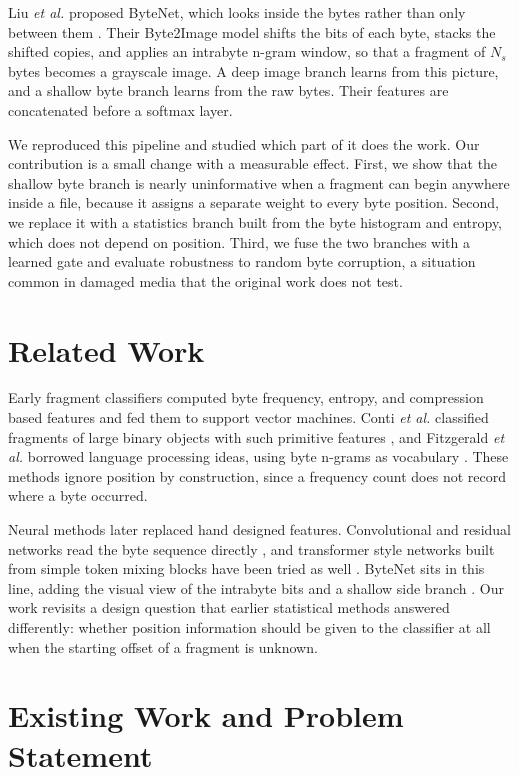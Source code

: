 \documentclass[journal]{IEEEtran}
\begin{document}
Liu \textit{et al.} proposed ByteNet, which looks inside the bytes rather than only between them \cite{bytenet}. Their Byte2Image model shifts the bits of each byte, stacks the shifted copies, and applies an intrabyte n-gram window, so that a fragment of $N_s$ bytes becomes a grayscale image. A deep image branch learns from this picture, and a shallow byte branch learns from the raw bytes. Their features are concatenated before a softmax layer.

We reproduced this pipeline and studied which part of it does the work. Our contribution is a small change with a measurable effect. First, we show that the shallow byte branch is nearly uninformative when a fragment can begin anywhere inside a file, because it assigns a separate weight to every byte position. Second, we replace it with a statistics branch built from the byte histogram and entropy, which does not depend on position. Third, we fuse the two branches with a learned gate and evaluate robustness to random byte corruption, a situation common in damaged media that the original work does not test.

\section{Related Work}
Early fragment classifiers computed byte frequency, entropy, and compression based features and fed them to support vector machines. Conti \textit{et al.} classified fragments of large binary objects with such primitive features \cite{conti}, and Fitzgerald \textit{et al.} borrowed language processing ideas, using byte n-grams as vocabulary \cite{fitz}. These methods ignore position by construction, since a frequency count does not record where a byte occurred.

Neural methods later replaced hand designed features. Convolutional and residual networks read the byte sequence directly \cite{resnet}, and transformer style networks built from simple token mixing blocks have been tried as well \cite{poolformer}. ByteNet sits in this line, adding the visual view of the intrabyte bits and a shallow side branch \cite{bytenet}. Our work revisits a design question that earlier statistical methods answered differently: whether position information should be given to the classifier at all when the starting offset of a fragment is unknown.

\section{Existing Work and Problem Statement}
\end{document}
